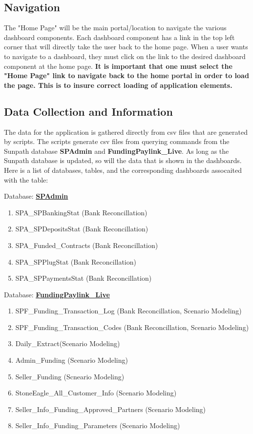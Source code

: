 \documentclass[titlepage]{article}
\begin{document}
\subsection{Navigation}
The "Home Page" will be the main portal/location to navigate the various dashboard components. Each dashboard component has a link in the top left corner that will directly take the user back to the home page. When a user wants to navigate to a dashboard, they must click on the link to the desired dashboard component at the home page. \textbf{It is important that one must select the "Home Page" link to navigate back to the home portal in order to load the page. This is to insure correct loading of application elements.}

\subsection{Data Collection and Information}
The data for the application is gathered directly from csv files that are generated by scripts. The scripts generate csv files from querying commands from the Sunpath database \textbf{SPAdmin} and \textbf{FundingPaylink\_Live}. As long as the Sunpath database is updated, so will the data that is shown in the dashboards. Here is a list of databases, tables, and the corresponding dashboards assocaited with the table:

Database: \underline{\textbf{SPAdmin}}
\begin{enumerate}
	\item SPA\_SPBankingStat (Bank Reconcillation)
	\item SPA\_SPDepositsStat (Bank Reconcillation)
	\item SPA\_Funded\_Contracts (Bank Reconcillation)
	\item SPA\_SPPlugStat (Bank Reconcillation)
	\item SPA\_SPPaymentsStat (Bank Reconcillation)
\end{enumerate}

Database: \underline{\textbf{FundingPaylink\_Live}}
	\begin{enumerate}
		\item SPF\_Funding\_Transaction\_Log (Bank Reconcillation, Scenario Modeling)
		\item SPF\_Funding\_Transaction\_Codes (Bank Reconcillation, Scenario Modeling)
		\item Daily\_Extract(Scenario Modeling)
		\item Admin\_Funding (Scenario Modeling)
		\item Seller\_Funding (Scneario Modeling)
		\item StoneEagle\_All\_Customer\_Info (Scenario Modeling)
		\item Seller\_Info\_Funding\_Approved\_Partners (Scenario Modeling)
		\item Seller\_Info\_Funding\_Parameters (Scenario Modeling)
	\end{enumerate}
	
\end{document}
